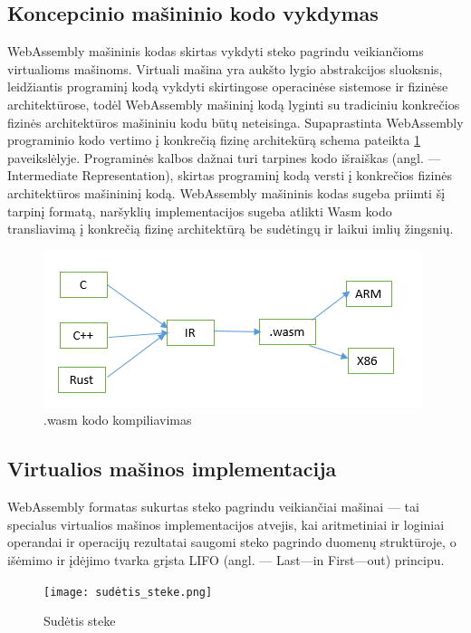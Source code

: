 \documentclass{VUMIFPSkursinis}
\begin{document}
\subsection{Koncepcinio mašininio kodo vykdymas}
WebAssembly mašininis kodas skirtas vykdyti steko pagrindu veikiančioms virtualioms mašinoms. Virtuali mašina yra aukšto lygio abstrakcijos sluoksnis, leidžiantis programinį kodą vykdyti skirtingose operacinėse sistemose ir fizinėse architektūrose, todėl WebAssembly mašininį kodą lyginti su tradiciniu konkrečios fizinės architektūros mašininiu kodu būtų neteisinga. Supaprastinta WebAssembly programinio kodo vertimo į konkrečią fizinę architekūrą schema pateikta \ref{fig:wasm_compilation} paveikslėlyje. Programinės kalbos dažnai turi tarpines kodo išraiškas (angl. — Intermediate Representation), skirtas programinį kodą versti į konkrečios fizinės architektūros mašinininį kodą. WebAssembly mašininis kodas sugeba priimti šį tarpinį formatą, naršyklių implementacijos sugeba atlikti Wasm kodo transliavimą į konkrečią fizinę architektūrą be sudėtingų ir laikui imlių žingsnių. 

\begin{figure}[h!]
  \begin{center}
  \includegraphics[scale=0.8]{webassembly_kompiliavimas.png}
  \end{center}
  \caption{.wasm kodo kompiliavimas}
  \label{fig:wasm_compilation}
\end{figure}

\subsection{Virtualios mašinos implementacija}

WebAssembly formatas sukurtas steko pagrindu veikiančiai mašinai — tai specialus virtualios mašinos implementacijos atvejis, kai aritmetiniai ir loginiai operandai ir operacijų rezultatai saugomi steko pagrindo duomenų struktūroje, o išėmimo ir įdėjimo tvarka grįsta LIFO (angl. — Last—in First—out) principu. 

\begin{figure}[h!]
  \begin{center}
  \texttt{[image: sudėtis\_steke.png]}
  \end{center}
  \caption{Sudėtis steke}
  \label{fig:stack_addition}
\end{figure}
\end{document}
